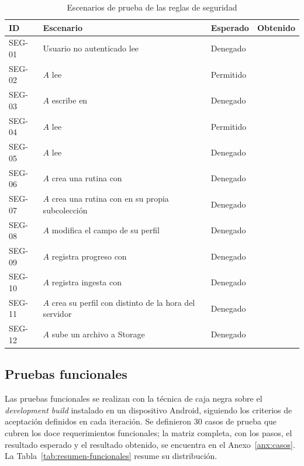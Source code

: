 \begin{table}[H]
\centering
\caption{Escenarios de prueba de las reglas de seguridad}
\label{tab:prueba-reglas}
\small
\begin{tabularx}{\textwidth}{|L{0.9cm}|Y|C{1.9cm}|C{1.9cm}|}
\hline
{} \textbf{ID} & \textbf{Escenario} & \textbf{Esperado} & \textbf{Obtenido} \\
\hline
SEG-01 & Usuario no autenticado lee  & Denegado &
\pendiente{} \\ \hline
SEG-02 & $A$ lee  & Permitido & \pendiente{} \\ \hline
SEG-03 & $A$ escribe en  & Denegado & \pendiente{} \\ \hline
SEG-04 & $A$ lee  & Permitido & \pendiente{} \\ \hline
SEG-05 & $A$ lee  & Denegado & \pendiente{} \\ \hline
SEG-06 & $A$ crea una rutina con  & Denegado &
\pendiente{} \\ \hline
SEG-07 & $A$ crea una rutina con  en su propia
subcolección & Denegado & \pendiente{} \\ \hline
SEG-08 & $A$ modifica el campo  de su perfil & Denegado &
\pendiente{} \\ \hline
SEG-09 & $A$ registra progreso con  & Denegado &
\pendiente{} \\ \hline
SEG-10 & $A$ registra ingesta con  & Denegado &
\pendiente{} \\ \hline
SEG-11 & $A$ crea su perfil con  distinto de la hora del
servidor & Denegado & \pendiente{} \\ \hline
SEG-12 & $A$ sube un archivo a Storage & Denegado & \pendiente{} \\
\hline
\end{tabularx}
\end{table}

\subsection{Pruebas funcionales}

Las pruebas funcionales se realizan con la técnica de caja negra sobre el
\emph{development build} instalado en un dispositivo Android, siguiendo los
criterios de aceptación definidos en cada iteración. Se definieron 30 casos de
prueba que cubren los doce requerimientos funcionales; la matriz completa, con
los pasos, el resultado esperado y el resultado obtenido, se encuentra en el
Anexo~\ref{anx:casos}. La Tabla~\ref{tab:resumen-funcionales} resume su
distribución.

